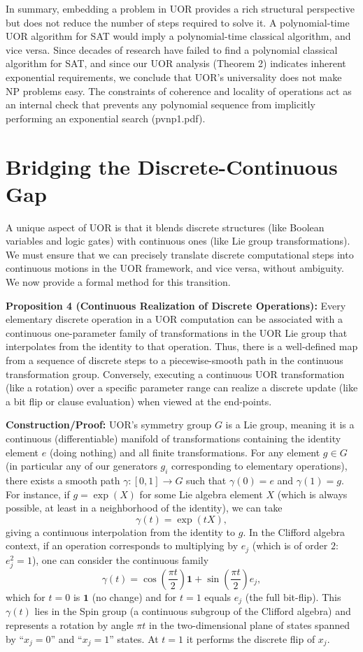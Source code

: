 \documentclass{article}
\begin{document}
In summary, embedding a problem in UOR provides a rich structural perspective but does not reduce the number of steps required to solve it. A polynomial-time UOR algorithm for SAT would imply a polynomial-time classical algorithm, and vice versa. Since decades of research have failed to find a polynomial classical algorithm for SAT, and since our UOR analysis (Theorem 2) indicates inherent exponential requirements, we conclude that UOR’s universality does not make NP problems easy. The constraints of coherence and locality of operations act as an internal check that prevents any polynomial sequence from implicitly performing an exponential search (pvnp1.pdf).

\section{Bridging the Discrete-Continuous Gap}

A unique aspect of UOR is that it blends discrete structures (like Boolean variables and logic gates) with continuous ones (like Lie group transformations). We must ensure that we can precisely translate discrete computational steps into continuous motions in the UOR framework, and vice versa, without ambiguity. We now provide a formal method for this transition.

\medskip
\textbf{Proposition 4 (Continuous Realization of Discrete Operations):} Every elementary discrete operation in a UOR computation can be associated with a continuous one-parameter family of transformations in the UOR Lie group that interpolates from the identity to that operation. Thus, there is a well-defined map from a sequence of discrete steps to a piecewise-smooth path in the continuous transformation group. Conversely, executing a continuous UOR transformation (like a rotation) over a specific parameter range can realize a discrete update (like a bit flip or clause evaluation) when viewed at the end-points.

\medskip
\textbf{Construction/Proof:} UOR’s symmetry group $G$ is a Lie group, meaning it is a continuous (differentiable) manifold of transformations containing the identity element $e$ (doing nothing) and all finite transformations. For any element $g \in G$ (in particular any of our generators $g_i$ corresponding to elementary operations), there exists a smooth path $\gamma: [0,1] \to G$ such that $\gamma(0) = e$ and $\gamma(1) = g$. For instance, if $g = \exp(X)$ for some Lie algebra element $X$ (which is always possible, at least in a neighborhood of the identity), we can take 
\[
\gamma(t) = \exp(tX),
\]
giving a continuous interpolation from the identity to $g$. In the Clifford algebra context, if an operation corresponds to multiplying by $e_j$ (which is of order $2$: $e_j^2=1$), one can consider the continuous family
\[
\gamma(t) = \cos\left(\frac{\pi t}{2}\right) \mathbf{1} + \sin\left(\frac{\pi t}{2}\right)e_j,
\]
which for $t=0$ is $\mathbf{1}$ (no change) and for $t=1$ equals $e_j$ (the full bit-flip). This $\gamma(t)$ lies in the Spin group (a continuous subgroup of the Clifford algebra) and represents a rotation by angle $\pi t$ in the two-dimensional plane of states spanned by ``$x_j=0$'' and ``$x_j=1$'' states. At $t=1$ it performs the discrete flip of $x_j$.
\end{document}
